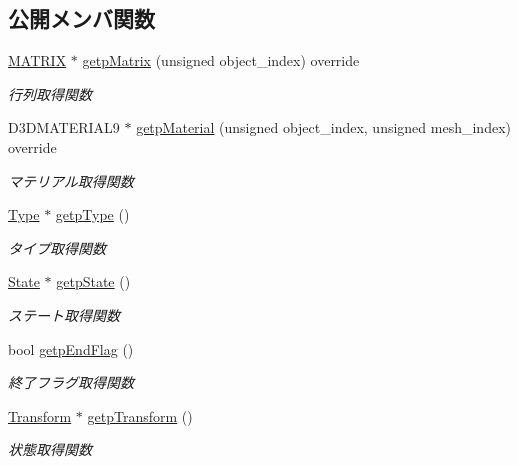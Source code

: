 \subsection*{公開メンバ関数}
\begin{DoxyCompactItemize}
\item 
\mbox{\hyperlink{_matrix_8h_a032295cd9fb1b711757c90667278e744}{M\+A\+T\+R\+IX}} $\ast$ \mbox{\hyperlink{class_fade_a468f87b671026f883443d6cdceeb95c6}{getp\+Matrix}} (unsigned object\+\_\+index) override
\begin{DoxyCompactList}\small\item\em 行列取得関数 \end{DoxyCompactList}\item 
D3\+D\+M\+A\+T\+E\+R\+I\+A\+L9 $\ast$ \mbox{\hyperlink{class_fade_adbd049cfdaf165670d1b97b03151a5cd}{getp\+Material}} (unsigned object\+\_\+index, unsigned mesh\+\_\+index) override
\begin{DoxyCompactList}\small\item\em マテリアル取得関数 \end{DoxyCompactList}\item 
\mbox{\hyperlink{class_fade_ac06f27215b454aa05b93c236476d6e80}{Type}} $\ast$ \mbox{\hyperlink{class_fade_a098d3f7b05dbcdecb185c6cce5bbcec0}{getp\+Type}} ()
\begin{DoxyCompactList}\small\item\em タイプ取得関数 \end{DoxyCompactList}\item 
\mbox{\hyperlink{class_fade_ae77826bf3ff2ab95fb7b3b6f95cba80a}{State}} $\ast$ \mbox{\hyperlink{class_fade_a5079a04d7f61eb68bf130ad418e0dbb8}{getp\+State}} ()
\begin{DoxyCompactList}\small\item\em ステート取得関数 \end{DoxyCompactList}\item 
bool \mbox{\hyperlink{class_fade_a7abd60e0881a5b7e9548ec544a0e2198}{getp\+End\+Flag}} ()
\begin{DoxyCompactList}\small\item\em 終了フラグ取得関数 \end{DoxyCompactList}\item 
\mbox{\hyperlink{class_transform}{Transform}} $\ast$ \mbox{\hyperlink{class_fade_ac703f40e9ed3f91c41525d884306a260}{getp\+Transform}} ()
\begin{DoxyCompactList}\small\item\em 状態取得関数 \end{DoxyCompactList}\item 

\end{DoxyCompactItemize}
